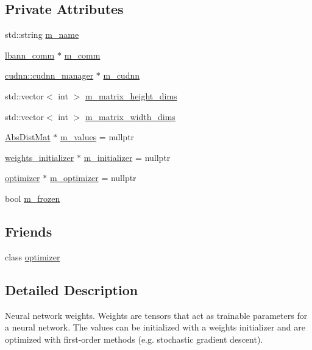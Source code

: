 \subsection*{Private Attributes}
\begin{DoxyCompactItemize}
\item 
std\+::string \hyperlink{classlbann_1_1weights_a08abf0bb29aa47be21bfc7473b4b9b99}{m\+\_\+name}
\item 
\hyperlink{classlbann_1_1lbann__comm}{lbann\+\_\+comm} $\ast$ \hyperlink{classlbann_1_1weights_a223e8907034888392548ae901222b39c}{m\+\_\+comm}
\item 
\hyperlink{classlbann_1_1cudnn_1_1cudnn__manager}{cudnn\+::cudnn\+\_\+manager} $\ast$ \hyperlink{classlbann_1_1weights_a873e8c14998915e442d03b8dd7d2fdf7}{m\+\_\+cudnn}
\item 
std\+::vector$<$ int $>$ \hyperlink{classlbann_1_1weights_a9287dfbd8a7e4a9f5e0d6371d43ee92f}{m\+\_\+matrix\+\_\+height\+\_\+dims}
\item 
std\+::vector$<$ int $>$ \hyperlink{classlbann_1_1weights_a8317a198bc5b4cd6bee2c806eefd1f12}{m\+\_\+matrix\+\_\+width\+\_\+dims}
\item 
\hyperlink{base_8hpp_a9a697a504ae84010e7439ffec862b470}{Abs\+Dist\+Mat} $\ast$ \hyperlink{classlbann_1_1weights_a6b2df671b6d4c4dd595477971eea0543}{m\+\_\+values} = nullptr
\item 
\hyperlink{classlbann_1_1weights__initializer}{weights\+\_\+initializer} $\ast$ \hyperlink{classlbann_1_1weights_a3ddbcce8d543e975efeebdb43e82444c}{m\+\_\+initializer} = nullptr
\item 
\hyperlink{classlbann_1_1optimizer}{optimizer} $\ast$ \hyperlink{classlbann_1_1weights_a5f3b4d4a3ad390c2a9bdbe6c4971de65}{m\+\_\+optimizer} = nullptr
\item 
bool \hyperlink{classlbann_1_1weights_a3962305112ba98ef2eb89c6f7035f6dd}{m\+\_\+frozen}
\end{DoxyCompactItemize}
\subsection*{Friends}
\begin{DoxyCompactItemize}
\item 
class \hyperlink{classlbann_1_1weights_afe38b5936c7fe885023474dd92c72c67}{optimizer}
\end{DoxyCompactItemize}


\subsection{Detailed Description}
Neural network weights. Weights are tensors that act as trainable parameters for a neural network. The values can be initialized with a weights initializer and are optimized with first-\/order methods (e.\+g. stochastic gradient descent).

